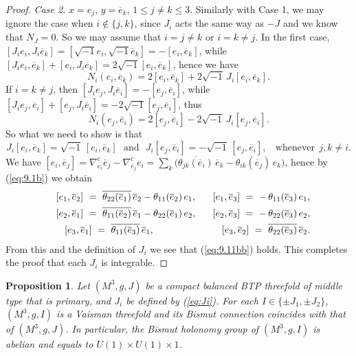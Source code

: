 \documentclass{amsart}
\numberwithin{equation}{section}
\newtheorem{proposition}[theorem]{Proposition}
\theoremstyle{definition}
\renewcommand{\1}{\mathds{1}}
\renewcommand{\>}{\rightarrow}
\begin{document}
\begin{proof}
{\em Case 2.} $x=e_j$, $y=\overline{e}_k$, $1\leq j\neq k\leq 3$. Similarly with Case 1, we may ignore the case when $i\not\in \{ j,k\}$,
since $J_i$ acts the same way as $-J$ and we know that $N_J=0$. So we may assume that $i=j\neq k$  or $i=k\neq j$. In the first case, $[J_ie_i, J_i\overline{e}_k] = [\sqrt{-1}e_i, \sqrt{-1}\overline{e}_k]=-[e_i,\overline{e}_k]$, while $[J_ie_i,\overline{e}_k]+[e_i, J_i\overline{e}_k]=2\sqrt{-1}[e_i, \overline{e}_k]$, hence we have
$$ N_i(e_i, \overline{e}_k) = 2[e_i,\overline{e}_k] + 2\sqrt{-1}\,J_i [e_i, \overline{e}_k] . $$
If $i=k\neq j$, then $[J_ie_j, J_i\overline{e}_i] = -[e_j,\overline{e}_i]$, while $[J_ie_j, \overline{e}_i]+[e_j, J_i\overline{e}_i]=-2\sqrt{-1}[e_j, \overline{e}_i]$, thus
$$ N_i(e_j, \overline{e}_i) = 2[e_j,\overline{e}_i] - 2\sqrt{-1}\,J_i [e_j, \overline{e}_i] . $$
So what we need to show is that
\begin{equation} \label{eq:9.11bb}
J_i[e_i, \overline{e}_k]= \sqrt{-1} \,[e_i,\overline{e}_k] \ \ \ \mbox{and} \ \ \  J_i[e_j, \overline{e}_i]= -\sqrt{-1} \,[e_j,\overline{e}_i] ,\ \ \ \ \mbox{whenever} \ \ j,k\neq i.
\end{equation}
We have  $[e_i, \overline{e}_j] =  \nabla^c_{e_i}\overline{e}_j - \nabla^c_{\overline{e}_j}e_i = \sum_{k} \big( \overline{\theta_{jk }(\overline{e}_i) } \,\overline{e}_{k} - \theta_{ik }(\overline{e}_j)\,e_{k} \big) $, hence by (\ref{eq:9.1b}) we obtain
\begin{eqnarray*}
 &&  [e_1, \overline{e}_2] \ =  \ \overline{\theta_{22 }(\overline{e}_1) } \,\overline{e}_{2} - \theta_{11 }(\overline{e}_2)\,e_{1} , \ \ \ \ \  [e_1, \overline{e}_3]\  = \ - \, \theta_{11}(\overline{e}_3)\,e_1, \\
  &&   [e_2, \overline{e}_1] \ =  \ \overline{\theta_{11}(\overline{e}_2) } \,\overline{e}_{1} - \theta_{22 }(\overline{e}_1)\,e_{2} , \ \ \ \ \  [e_2, \overline{e}_3]\  = \ - \, \theta_{22}(\overline{e}_3)\,e_2,  \\
  && [e_3, \overline{e}_1] \ =  \ \overline{\theta_{11 }(\overline{e}_3) } \,\overline{e}_{1}  , \ \ \ \ \hspace{2.0cm}   [e_3, \overline{e}_2]\  = \   \overline{ \theta_{22}(\overline{e}_3)} \,\overline{e}_2.
\end{eqnarray*}
From this and the definition of $J_i$ we see that (\ref{eq:9.11bb}) holds. This completes the proof that each $J_i$ is integrable.
\end{proof}

\begin{proposition} \label{propVaisman}
Let $(M^3,g, J)$ be a compact balanced BTP threefold of middle type that is primary, and $J_i$ be defined by (\ref{eq:Ji}).
For each $I \in \{ \pm J_1, \pm J_2\}$, $(M^3,g,I)$ is a Vaisman threefold and its Bismut connection coincides with that of $(M^3,g,J)$. In particular, the Bismut holonomy group of $(M^3,g,I)$ is abelian and equals to $U(1)\!\times\!U(1)\!\times\!1$.
\end{proposition}
\end{document}
